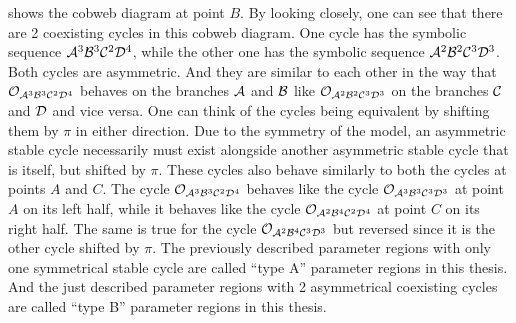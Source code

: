  shows the cobweb diagram at point $B$.
By looking closely, one can see that there are 2 coexisting cycles in this cobweb diagram.
One cycle has the symbolic sequence $\mathcal{A}^3\mathcal{B}^3\mathcal{C}^2\mathcal{D}^4$, while the other one has the symbolic sequence $\mathcal{A}^2\mathcal{B}^2\mathcal{C}^3\mathcal{D}^3$.
Both cycles are asymmetric.
And they are similar to each other in the way that $\mathcal{O}_{\mathcal{A}^3\mathcal{B}^3\mathcal{C}^2\mathcal{D}^4}$ behaves on the branches $\mathcal{A}$ and $\mathcal{B}$ like $\mathcal{O}_{\mathcal{A}^2\mathcal{B}^2\mathcal{C}^3\mathcal{D}^3}$ on the branches $\mathcal{C}$ and $\mathcal{D}$ and vice versa.
One can think of the cycles being equivalent by shifting them by $\pi$ in either direction.
Due to the symmetry of the model, an asymmetric stable cycle necessarily must exist alongside another asymmetric stable cycle that is itself, but shifted by $\pi$.
These cycles also behave similarly to both the cycles at points $A$ and $C$.
The cycle $\mathcal{O}_{\mathcal{A}^3\mathcal{B}^3\mathcal{C}^2\mathcal{D}^4}$ behaves like the cycle $\mathcal{O}_{\mathcal{A}^3\mathcal{B}^3\mathcal{C}^3\mathcal{D}^3}$ at point $A$ on its left half, while it behaves like the cycle $\mathcal{O}_{\mathcal{A}^2\mathcal{B}^4\mathcal{C}^2\mathcal{D}^4}$ at point $C$ on its right half.
The same is true for the cycle $\mathcal{O}_{\mathcal{A}^2\mathcal{B}^4\mathcal{C}^3\mathcal{D}^3}$ but reversed since it is the other cycle shifted by $\pi$.
The previously described parameter regions with only one symmetrical stable cycle are called ``type A'' parameter regions in this thesis.
And the just described parameter regions with 2 asymmetrical coexisting cycles are called ``type B'' parameter regions in this thesis.

